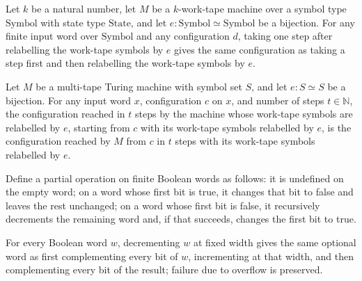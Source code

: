 \begin{lemma}
\label{Turing.counter_work_step}
\leanok
{}
Let $k$ be a natural number, let $M$ be a $k$-work-tape machine over a symbol type
$\mathrm{Symbol}$ with state type $\mathrm{State}$, and let
$e:\mathrm{Symbol}\simeq\mathrm{Symbol}$ be a bijection. For any finite input word over
$\mathrm{Symbol}$ and any configuration $d$, taking one step after relabelling the
work-tape symbols by $e$ gives the same configuration as taking a step first and then
relabelling the work-tape symbols by $e$.
\end{lemma}

\begin{theorem}
\label{Turing.MultiTapeTM.mapWorkSymbols_runFrom}
\leanok
{}
Let $M$ be a multi-tape Turing machine with symbol set $S$, and let $e:S\simeq S$ be a
bijection. For any input word $x$, configuration $c$ on $x$, and number of steps
$t\in\mathbb{N}$, the configuration reached in $t$ steps by the machine whose
work-tape symbols are relabelled by $e$, starting from $c$ with its work-tape symbols
relabelled by $e$, is the configuration reached by $M$ from $c$ in $t$ steps with its
work-tape symbols relabelled by $e$.
\end{theorem}

\begin{definition}
\label{Turing.decFixed}
\leanok
Define a partial operation on finite Boolean words as follows: it is undefined on the
empty word; on a word whose first bit is true, it changes that bit to false and leaves
the rest unchanged; on a word whose first bit is false, it recursively decrements the
remaining word and, if that succeeds, changes the first bit to true.
\end{definition}

\begin{lemma}
\label{Turing.counter_dec_complement}
\leanok
{}
For every Boolean word $w$, decrementing $w$ at fixed width gives the same optional word
as first complementing every bit of $w$, incrementing at that width, and then
complementing every bit of the result; failure due to overflow is preserved.
\end{lemma}

